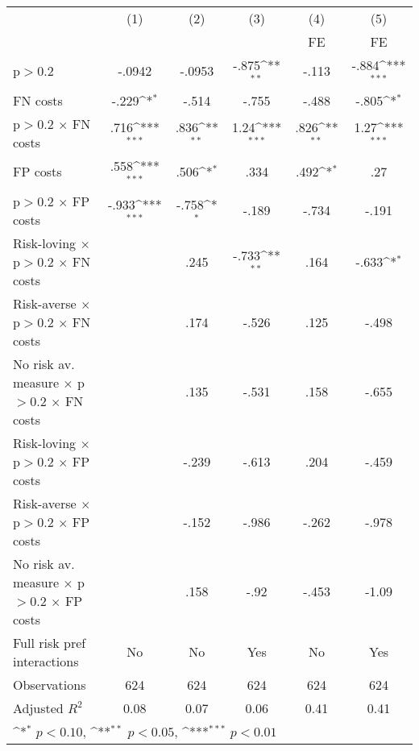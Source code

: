 {
\def\sym#1{\ifmmode^{#1}\else\(^{#1}\)\fi}
\begin{tabular}{l*{5}{c}}
\hline\hline
                &\multicolumn{1}{c}{(1)}&\multicolumn{1}{c}{(2)}&\multicolumn{1}{c}{(3)}&\multicolumn{1}{c}{(4)}&\multicolumn{1}{c}{(5)}\\
                &\multicolumn{1}{c}{}&\multicolumn{1}{c}{}&\multicolumn{1}{c}{}&\multicolumn{1}{c}{FE}&\multicolumn{1}{c}{FE}\\
\hline
p$>$0.2         &   -.0942         &   -.0953         &    -.875\sym{**} &    -.113         &    -.884\sym{***}\\
FN costs        &    -.229\sym{*}  &    -.514         &    -.755         &    -.488         &    -.805\sym{*}  \\
p$>$0.2 $\times$ FN costs&     .716\sym{***}&     .836\sym{**} &     1.24\sym{***}&     .826\sym{**} &     1.27\sym{***}\\
FP costs        &     .558\sym{***}&     .506\sym{*}  &     .334         &     .492\sym{*}  &      .27         \\
p$>$0.2 $\times$ FP costs&    -.933\sym{***}&    -.758\sym{*}  &    -.189         &    -.734         &    -.191         \\
Risk-loving $\times$ p$>$0.2 $\times$ FN costs&                  &     .245         &    -.733\sym{**} &     .164         &    -.633\sym{*}  \\
Risk-averse $\times$ p$>$0.2 $\times$ FN costs&                  &     .174         &    -.526         &     .125         &    -.498         \\
No risk av. measure $\times$ p$>$0.2 $\times$ FN costs&                  &     .135         &    -.531         &     .158         &    -.655         \\
Risk-loving $\times$ p$>$0.2 $\times$ FP costs&                  &    -.239         &    -.613         &     .204         &    -.459         \\
Risk-averse $\times$ p$>$0.2 $\times$ FP costs&                  &    -.152         &    -.986         &    -.262         &    -.978         \\
No risk av. measure $\times$ p$>$0.2 $\times$ FP costs&                  &     .158         &     -.92         &    -.453         &    -1.09         \\
Full risk pref interactions&       No         &       No         &      Yes         &       No         &      Yes         \\
\hline
Observations    &      624         &      624         &      624         &      624         &      624         \\
Adjusted \(R^{2}\)&     0.08         &     0.07         &     0.06         &     0.41         &     0.41         \\
\hline\hline
\multicolumn{6}{l}{\footnotesize \sym{*} \(p<0.10\), \sym{**} \(p<0.05\), \sym{***} \(p<0.01\)}\\
\end{tabular}
}
